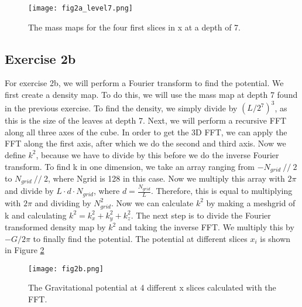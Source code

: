 \begin{figure}[h!]
  \centering
  \texttt{[image: fig2a\_level7.png]}
  \caption{The mass maps for the four first slices in x at a depth of 7.}
  \label{fig:2a3}
\end{figure}

\subsection{Exercise 2b}

For exercise 2b, we will perform a Fourier transform to find the potential. We first create a density map. To do this, we will use the mass map at depth 7 found in the previous exercise. To find the density, we simply divide by $(L/2^7)^3$, as this is the size of the leaves at depth 7. Next, we will perform a recursive FFT along all three axes of the cube. In order to get the 3D FFT, we can apply the FFT along the first axis, after which we do the second and third axis. Now we define $k^2$, because we have to divide by this before we do the inverse Fourier transform. To find k in one dimension, we take an array ranging from $-N_{grid}\ //\ 2 $ to $N_{grid}\ // \ 2$, where Ngrid is 128 in this case. Now we multiply this array with $2\pi$ and divide by $L \cdot d \cdot N_{grid}$, where $d = \frac{N_{grid}}{L}$. Therefore, this is equal to multiplying with $2\pi$ and dividing by $N_{grid}^2$. Now we can calculate $k^2$ by making a meshgrid of k and calculating $k^2 = k_x^2 + k_y^2 + k_z^2$. The next step is to divide the Fourier transformed density map by $k^2$ and taking the inverse FFT. We multiply this by $-G/2\pi$ to finally find the potential. The potential at different slices $x_i$ is shown in Figure \ref{fig:2b} 

\begin{figure}[h!]
  \centering
  \texttt{[image: fig2b.png]}
  \caption{The Gravitational potential at 4 different x slices calculated with the FFT.}
  \label{fig:2b}
\end{figure}

